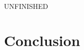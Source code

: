 \documentclass[acmsmall,review,anonymous]{acmart}\settopmatter{printfolios=true,printccs=false,printacmref=false}
\begin{document}
UNFINISHED

\section{Conclusion}








\end{document}
